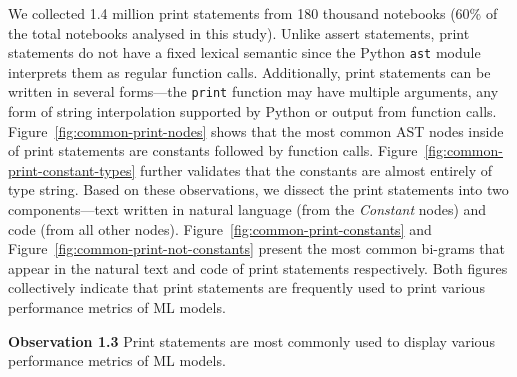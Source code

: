\documentclass[smallextended]{svjour3}       %
\newcommand{\highlight}[1]{\begin{framed}%
  \noindent#1
\end{framed}}
\providecommand{\DIFaddbegin}{} %
\providecommand{\DIFaddend}{} %
\providecommand{\DIFdelbegin}{} %
\providecommand{\DIFdelend}{} %
\newcommand{\DIFscaledelfig}{0.5}
\newlength{\DIFdelgraphicswidth} %
\newlength{\DIFdelgraphicsheight} %
\newcommand{\DIFaddincludegraphics}[2][]{{\color{blue}\fbox{\DIFOincludegraphics[#1]{#2}}}} %
\newcommand{\DIFdelincludegraphics}[2][]{%
\sbox{\DIFdelgraphicsbox}{\DIFOincludegraphics[#1]{#2}}%
\settoboxwidth{\DIFdelgraphicswidth}{\DIFdelgraphicsbox} %
\settoboxtotalheight{\DIFdelgraphicsheight}{\DIFdelgraphicsbox} %
\scalebox{\DIFscaledelfig}{%
\parbox[b]{\DIFdelgraphicswidth}{\usebox{\DIFdelgraphicsbox}\\[-\baselineskip] \rule{\DIFdelgraphicswidth}{0em}}\llap{\resizebox{\DIFdelgraphicswidth}{\DIFdelgraphicsheight}{%
\setlength{\unitlength}{\DIFdelgraphicswidth}%
\begin{picture}(1,1)%
\thicklines\linethickness{2pt} %
{\color[rgb]{1,0,0}\put(0,0){\framebox(1,1){}}}%
{\color[rgb]{1,0,0}\put(0,0){\line( 1,1){1}}}%
{\color[rgb]{1,0,0}\put(0,1){\line(1,-1){1}}}%
\end{picture}%
}\hspace*{3pt}}} %
} %
\DeclareRobustCommand{\DIFaddbegin}{\DIFOaddbegin \let\includegraphics\DIFaddincludegraphics} %
\DeclareRobustCommand{\DIFaddend}{\DIFOaddend \let\includegraphics\DIFOincludegraphics} %
\DeclareRobustCommand{\DIFdelbegin}{\DIFOdelbegin \let\includegraphics\DIFdelincludegraphics} %
\DeclareRobustCommand{\DIFdelend}{\DIFOaddend \let\includegraphics\DIFOincludegraphics} %
\begin{document}
We collected 1.4 million print statements from 180 thousand notebooks (60\% of the total notebooks analysed in this study). Unlike assert statements, print statements do not have a fixed lexical semantic since the Python \lstinline{ast} module interprets them as regular function calls. Additionally, print statements can be written in several forms---the \lstinline{print} function may have multiple arguments, any form of string interpolation supported by Python or output from function calls. Figure~\ref{fig:common-print-nodes} shows that the most common AST nodes inside of print statements are constants followed by function calls. Figure~\ref{fig:common-print-constant-types} further validates that the constants are almost entirely of type string. Based on these observations, we dissect the print statements into two components---text written in natural language (from the \emph{Constant} nodes) and code (from all other nodes). Figure~\ref{fig:common-print-constants} and Figure~\ref{fig:common-print-not-constants} present the most common bi-grams that appear in the natural text and code of print statements respectively. Both figures collectively indicate that print statements are frequently used to print various performance metrics of ML models.

\DIFdelbegin %
\DIFdelend \DIFaddbegin \highlight{\textbf{Observation 1.3} Print statements are most commonly used to display various performance metrics of ML models.}
\DIFaddend 
\end{document}
